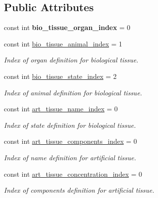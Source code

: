 \subsection*{Public Attributes}
\begin{DoxyCompactItemize}
\item 
\mbox{\label{classAxialForceDataset_a0b0307d4807ab3e5cdec0dce13ca9ef3}} 
const int {\bfseries bio\+\_\+tissue\+\_\+organ\+\_\+index} = 0
\item 
\mbox{\label{classAxialForceDataset_ad70b259aab52a227e2d40ffd4109b92d}} 
const int \hyperlink{classAxialForceDataset_ad70b259aab52a227e2d40ffd4109b92d}{bio\+\_\+tissue\+\_\+animal\+\_\+index} = 1
\begin{DoxyCompactList}\small\item\em Index of organ definition for biological tissue. \end{DoxyCompactList}\item 
\mbox{\label{classAxialForceDataset_af4f07ae203c9c501045dc8514cd90cd2}} 
const int \hyperlink{classAxialForceDataset_af4f07ae203c9c501045dc8514cd90cd2}{bio\+\_\+tissue\+\_\+state\+\_\+index} = 2
\begin{DoxyCompactList}\small\item\em Index of animal definition for biological tissue. \end{DoxyCompactList}\item 
\mbox{\label{classAxialForceDataset_a8a9bfe86bb6bf34aff2a027f3aedcd96}} 
const int \hyperlink{classAxialForceDataset_a8a9bfe86bb6bf34aff2a027f3aedcd96}{art\+\_\+tissue\+\_\+name\+\_\+index} = 0
\begin{DoxyCompactList}\small\item\em Index of state definition for biological tissue. \end{DoxyCompactList}\item 
\mbox{\label{classAxialForceDataset_a3d607d97f924a8ed38ac82ccf9dab666}} 
const int \hyperlink{classAxialForceDataset_a3d607d97f924a8ed38ac82ccf9dab666}{art\+\_\+tissue\+\_\+components\+\_\+index} = 0
\begin{DoxyCompactList}\small\item\em Index of name definition for artificial tissue. \end{DoxyCompactList}\item 
\mbox{\label{classAxialForceDataset_ae8c05aa460294289fbf2fe18e8a2fe37}} 
const int \hyperlink{classAxialForceDataset_ae8c05aa460294289fbf2fe18e8a2fe37}{art\+\_\+tissue\+\_\+concentration\+\_\+index} = 0
\begin{DoxyCompactList}\small\item\em Index of components definition for artificial tissue. \end{DoxyCompactList}\end{DoxyCompactItemize}
